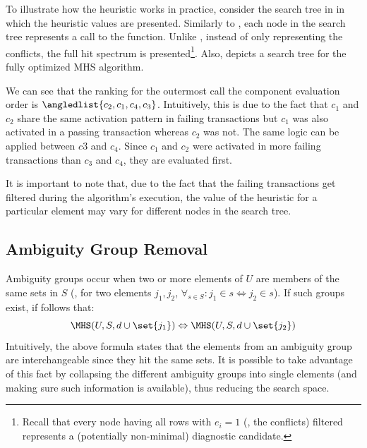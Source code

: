 To illustrate how the heuristic works in practice, consider the search
tree in  in which the heuristic
values are presented.
%
Similarly to , each node
in the search tree represents a call to the function.
%
Unlike , instead of only
representing the conflicts, the full hit spectrum is
presented\footnote{Recall that every node having all rows with
  $e_i = 1$ (\ie, the conflicts) filtered represents a (potentially
  non-minimal) diagnostic candidate.}.
%
Also,  depicts a search tree
for the fully optimized \ac{MHS} algorithm.
%

We can see that the ranking for the outermost call the component
evaluation order is $\angledlist{c_2,c_1,c_4,c_3}$.
%
Intuitively, this is due to the fact that $c_1$ and $c_2$ share the
same activation pattern in failing transactions but $c_1$ was also
activated in a passing transaction whereas $c_2$ was not.
%
The same logic can be applied between $c3$ and $c_4$.
%
Since $c_1$ and $c_2$ were activated in more failing transactions than
$c_3$ and $c_4$, they are evaluated first.


It is important to note that, due to the fact that the failing
transactions get filtered during the algorithm's execution, the value
of the heuristic for a particular element may vary for different nodes
in the search tree.



\subsection{Ambiguity Group Removal}
\label{sec:mhs2o:ambiguity-groups}
Ambiguity groups \citep{Sanchez11b} occur when two or more elements of
$U$ are members of the same sets in $S$ (\ie, for two elements
$j_1,j_2$, $\forall_{s\in S}: j_1 \in s \Leftrightarrow j_2 \in s$).
%
If such groups exist, if follows that:
\begin{equation}
  \MHS(U,S,d \cup \set{j_1}) \Leftrightarrow \MHS(U,S,d \cup \set{j_2})
\end{equation}
%
Intuitively, the above formula states that the elements from an
ambiguity group are interchangeable since they hit the same sets.
%
It is possible to take advantage of this fact by collapsing the
different ambiguity groups into single elements (and making sure
such information is available), thus reducing the search space.
%

